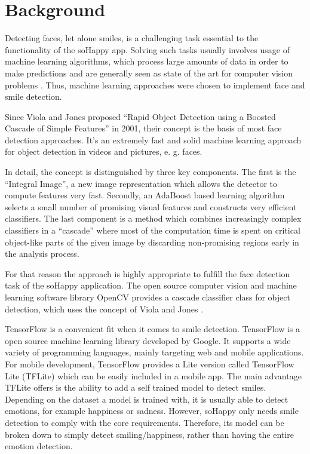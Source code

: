 \section{Background} \label{sec:background}
Detecting faces, let alone smiles, is a challenging task essential to the functionality of the soHappy app. Solving such tasks usually involves usage of machine learning algorithms, which process large amounts of data in order to make predictions and are generally seen as state of the art for computer vision problems \cite{foundations_ml}. Thus, machine learning approaches were chosen to implement face and smile detection.

Since Viola and Jones proposed ``Rapid Object Detection using a Boosted Cascade of Simple Features'' \cite{viola_jones} in 2001, their concept is the basis of most face detection approaches.
It's an extremely fast and solid machine learning approach for object detection in videos and pictures, e. g. faces.

In detail, the concept is distinguished by three key components.
The first is the ``Integral Image'', a new image representation which allows the detector to compute features very fast.
Secondly, an AdaBoost based learning algorithm selects a small number of promising visual features and constructs very efficient classifiers.
The last component is a method which combines increasingly complex classifiers in a ``cascade'' where most of the computation time is spent on critical object-like parts of the given image by discarding non-promising regions early in the analysis process.

For that reason the approach is highly appropriate to fulfill the face detection task of the soHappy application.
The open source computer vision and machine learning software library OpenCV provides a cascade classifier class for object detection, which uses the concept of Viola and Jones \cite{opencv_cascade_classifier}.

TensorFlow \cite{tensorflow} is a convenient fit when it comes to smile detection.
TensorFlow is a open source machine learning library developed by Google.
It supports a wide variety of programming languages, mainly targeting web and mobile applications.
For mobile development, TensorFlow provides a Lite version called TensorFlow Lite (TFLite) which can be easily included in a mobile app.
The main advantage TFLite offers is the ability to add a self trained model to detect smiles.
Depending on the dataset a model is trained with, it is usually able to detect emotions, for example happiness or sadness.
However, soHappy only needs smile detection to comply with the core requirements.
Therefore, its model can be broken down to simply detect smiling/happiness, rather than having the entire emotion detection.


